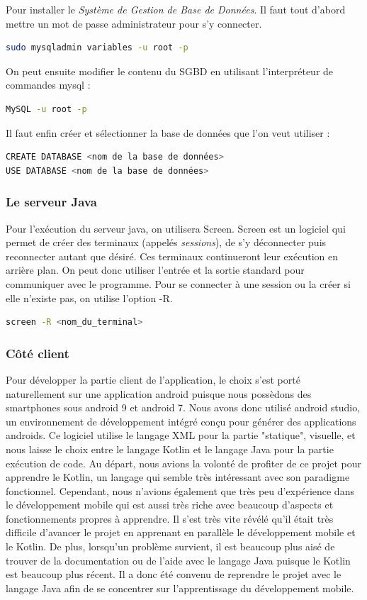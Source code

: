 Pour installer le \emph{Système de Gestion de Base de Données}. Il faut tout d'abord mettre un mot de passe administrateur
pour s'y connecter.
\begin{lstlisting}[language=bash]
sudo mysqladmin variables -u root -p
\end{lstlisting}
On peut ensuite modifier le contenu du SGBD en utilisant l'interpréteur de commandes mysql :
\begin{lstlisting}[language=bash]
MySQL -u root -p
\end{lstlisting}
Il faut enfin créer et sélectionner la base de données que l'on veut utiliser :
\begin{lstlisting}[language=bash]
CREATE DATABASE <nom de la base de données>
USE DATABASE <nom de la base de données>
\end{lstlisting}


\subsubsection{Le serveur Java}

Pour l'exécution du serveur java, on utilisera Screen.
Screen est un logiciel qui permet de créer des terminaux (appelés \emph{sessions}), de s'y déconnecter puis reconnecter autant que désiré.
Ces terminaux continueront leur exécution en arrière plan. On peut donc utiliser l'entrée et la sortie standard pour communiquer avec le programme.
Pour se connecter à une session ou la créer si elle n'existe pas, on utilise l'option -R.
\begin{lstlisting}[language=bash]
    screen -R <nom_du_terminal>
\end{lstlisting}

\subsubsection{Côté client}
Pour développer la partie client de l'application, le choix s'est porté naturellement sur une application android puisque nous possèdons des
smartphones sous android 9 et android 7. Nous avons donc utilisé android studio, un environnement de développement intégré conçu pour générer
des applications androids. Ce logiciel utilise le langage XML pour la partie "statique", visuelle, et nous laisse le choix entre le langage
Kotlin et le langage Java pour la partie exécution de code. Au départ, nous avions la volonté de profiter de ce projet pour apprendre
le Kotlin, un langage qui semble très intéressant avec son paradigme fonctionnel. Cependant, nous n'avions également que très peu d'expérience
dans le développement mobile qui est aussi très riche avec beaucoup d'aspects et fonctionnements propres à apprendre. Il s'est très vite révélé
qu'il était très difficile d'avancer le projet en apprenant en parallèle le développement mobile et le Kotlin. De plus, lorsqu'un problème
survient, il est beaucoup plus aisé de trouver de la documentation ou de l'aide avec le langage Java puisque le Kotlin est beaucoup plus récent.
Il a donc été convenu de reprendre le projet avec le langage Java afin de se concentrer sur l'apprentissage du développement mobile.

